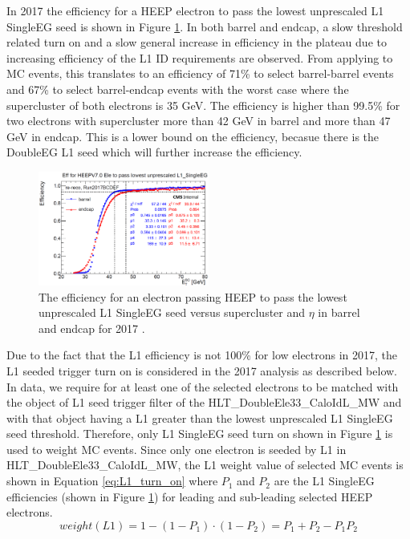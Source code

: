 In 2017 the efficiency for a HEEP electron to pass the lowest unprescaled L1 SingleEG seed is shown in Figure \ref{fig:L1_eff_2017}. In both barrel and endcap, a slow threshold related turn on and a slow general increase in efficiency in the plateau due to increasing efficiency of the L1 ID requirements are observed. From applying to MC events, this translates to an efficiency of 71\% to select barrel-barrel events and 67\% to select barrel-endcap events with the worst case where the supercluster \et of both electrons is 35 GeV. The efficiency is higher than 99.5\% for two electrons with supercluster \et more than 42 GeV in barrel and more than 47 GeV in endcap. This is a lower bound on the efficiency, becasue there is the DoubleEG L1 seed which will further increase the efficiency.
\begin{figure}[h!]
\begin{center}
\includegraphics[width=0.5\textwidth]{figures/Zprime/2017/trigger/l1SingleEGEff.png}
\caption{The efficiency for an electron passing HEEP to pass the lowest unprescaled L1 SingleEG seed versus supercluster \et and $\eta$ in barrel and endcap for 2017 \cite{CMS-AN-2018-021}.}
\label{fig:L1_eff_2017}
\end{center}
\end{figure}

Due to the fact that the L1 efficiency is not 100\% for low \et electrons in 2017, the L1 seeded trigger turn on is considered in the 2017 analysis as described below. In data, we require for at least one of the selected electrons to be matched with the object of L1 seed trigger filter of the HLT\_DoubleEle33\_CaloIdL\_MW and with that object having a L1 \et greater than the lowest unprescaled L1 SingleEG seed \et threshold. Therefore, only L1 SingleEG seed turn on shown in Figure \ref{fig:L1_eff_2017} is used to weight MC events. Since only one electron is seeded by L1 in HLT\_DoubleEle33\_CaloIdL\_MW, the L1 weight value of selected MC events is shown in Equation \ref{eq:L1_turn_on} where $P_{1}$ and $P_{2}$ are the L1 SingleEG efficiencies (shown in Figure \ref{fig:L1_eff_2017}) for leading and sub-leading selected HEEP electrons.
\begin{equation}
weight(L1)=1-(1-P_{1})\cdot(1-P_{2})=P_{1}+P_{2}-P_{1}P_{2}
\label{eq:L1_turn_on}
\end{equation}



